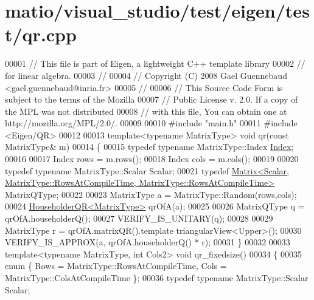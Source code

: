 \hypertarget{matio_2visual__studio_2test_2eigen_2test_2qr_8cpp_source}{}\section{matio/visual\+\_\+studio/test/eigen/test/qr.cpp}
\label{matio_2visual__studio_2test_2eigen_2test_2qr_8cpp_source}

\begin{DoxyCode}
00001 \textcolor{comment}{// This file is part of Eigen, a lightweight C++ template library}
00002 \textcolor{comment}{// for linear algebra.}
00003 \textcolor{comment}{//}
00004 \textcolor{comment}{// Copyright (C) 2008 Gael Guennebaud <gael.guennebaud@inria.fr>}
00005 \textcolor{comment}{//}
00006 \textcolor{comment}{// This Source Code Form is subject to the terms of the Mozilla}
00007 \textcolor{comment}{// Public License v. 2.0. If a copy of the MPL was not distributed}
00008 \textcolor{comment}{// with this file, You can obtain one at http://mozilla.org/MPL/2.0/.}
00009 
00010 \textcolor{preprocessor}{#include "main.h"}
00011 \textcolor{preprocessor}{#include <Eigen/QR>}
00012 
00013 \textcolor{keyword}{template}<\textcolor{keyword}{typename} MatrixType> \textcolor{keywordtype}{void} qr(\textcolor{keyword}{const} MatrixType& m)
00014 \{
00015   \textcolor{keyword}{typedef} \textcolor{keyword}{typename} MatrixType::Index \hyperlink{namespace_eigen_a62e77e0933482dafde8fe197d9a2cfde}{Index};
00016 
00017   Index rows = m.rows();
00018   Index cols = m.cols();
00019 
00020   \textcolor{keyword}{typedef} \textcolor{keyword}{typename} MatrixType::Scalar Scalar;
00021   \textcolor{keyword}{typedef} 
      \hyperlink{group___core___module_class_eigen_1_1_matrix}{Matrix<Scalar, MatrixType::RowsAtCompileTime, MatrixType::RowsAtCompileTime>}
       MatrixQType;
00022 
00023   MatrixType a = MatrixType::Random(rows,cols);
00024   \hyperlink{group___q_r___module}{HouseholderQR<MatrixType>} qrOfA(a);
00025 
00026   MatrixQType q = qrOfA.householderQ();
00027   VERIFY\_IS\_UNITARY(q);
00028 
00029   MatrixType r = qrOfA.matrixQR().template triangularView<Upper>();
00030   VERIFY\_IS\_APPROX(a, qrOfA.householderQ() * r);
00031 \}
00032 
00033 \textcolor{keyword}{template}<\textcolor{keyword}{typename} MatrixType, \textcolor{keywordtype}{int} Cols2> \textcolor{keywordtype}{void} qr\_fixedsize()
00034 \{
00035   \textcolor{keyword}{enum} \{ Rows = MatrixType::RowsAtCompileTime, Cols = MatrixType::ColsAtCompileTime \};
00036   \textcolor{keyword}{typedef} \textcolor{keyword}{typename} MatrixType::Scalar Scalar;

\end{DoxyCode}
